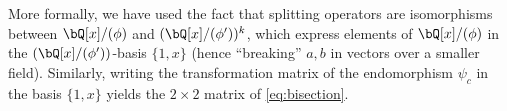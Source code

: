   More formally, we have used the fact that splitting operators are isomorphisms between $\bQ[x]/(\phi)$ and $(\bQ[x]/(\phi'))^k$, which express elements of $\bQ[x]/(\phi)$ in the $(\bQ[x]/(\phi'))$-basis $\{1,x\}$ (hence ``breaking'' $a,b$ in vectors over a smaller field). Similarly, writing the transformation matrix of the endomorphism $\psi_c$ in the basis $\{1,x\}$ yields the $2\times 2$ matrix of \eqref{eq:bisection}.
 
 
 
